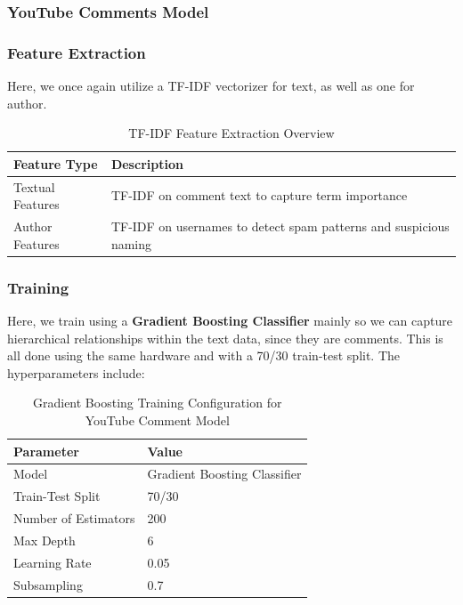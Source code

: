 \documentclass{article}
\begin{document}
\subsubsection{YouTube Comments Model}
\subsubsection*{Feature Extraction}

Here, we once again utilize a TF-IDF vectorizer for text, as well as one for author.

\begin{table}[H]
\renewcommand{\arraystretch}{1.3}
\setlength{\tabcolsep}{10pt}
\centering
\begin{tabular}{|p{5cm}|p{9cm}|}
\hline
\textbf{Feature Type} & \textbf{Description} \\
\hline
Textual Features & TF-IDF on comment text to capture term importance \\
\hline
Author Features & TF-IDF on usernames to detect spam patterns and suspicious naming \\
\hline
\end{tabular}
\caption{TF-IDF Feature Extraction Overview}
\label{tab:tfidf_features}
\end{table}

\subsubsection*{Training}

Here, we train using a \textbf{Gradient Boosting Classifier} mainly so we can capture hierarchical relationships within the text data, since they are comments. This is all done using the same hardware and with a 70/30 train-test split. The hyperparameters include:

\begin{table}[h!]
    \centering
    \renewcommand{\arraystretch}{1.2}
    \setlength{\tabcolsep}{11pt}
    \begin{tabular}{|l|l|}
        \hline
        \textbf{Parameter} & \textbf{Value} \\
        \hline
        Model & Gradient Boosting Classifier \\
        \hline
        Train-Test Split & 70/30 \\
        \hline
        Number of Estimators & 200 \\
        \hline
        Max Depth & 6 \\
        \hline
        Learning Rate & 0.05 \\
        \hline
        Subsampling & 0.7 \\
        \hline
    \end{tabular}
    \caption{Gradient Boosting Training Configuration for YouTube Comment Model}
\end{table}
\end{document}
